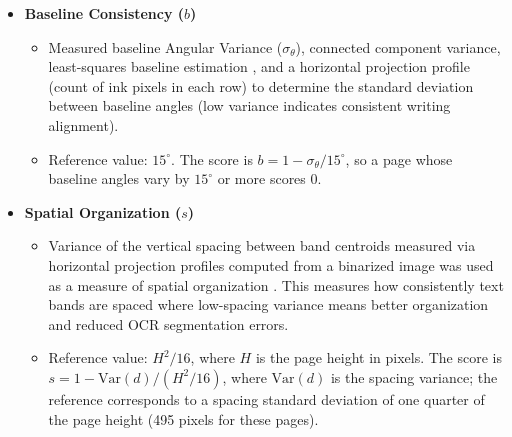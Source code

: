 \documentclass[conference]{IEEEtran}
\begin{document}
\begin{itemize}
  \item \textbf{Baseline Consistency ($b$)}
  \begin{itemize}
    \item Measured baseline Angular Variance ($\sigma_\theta$), connected
    component variance, least-squares baseline estimation
    \cite{ogorman1993, opencv_shape}, and a horizontal projection profile
    (count of ink pixels in each row) \cite{likforman2007, papavassiliou2010}
    to determine the standard deviation between baseline angles (low variance
    indicates consistent writing alignment).
    \item Reference value: $15^\circ$. The score is
    $b = 1 - \sigma_\theta / 15^\circ$, so a page whose baseline angles vary by
    $15^\circ$ or more scores 0.
  \end{itemize}

  \item \textbf{Spatial Organization ($s$)}
  \begin{itemize}
    \item Variance of the vertical spacing between band centroids measured via
    horizontal projection profiles computed from a binarized image was used as
    a measure of spatial organization \cite{likforman2007}. This measures how
    consistently text bands are spaced where low-spacing variance means better
    organization and reduced OCR segmentation errors.
    \item Reference value: $H^2/16$, where $H$ is the page height in pixels.
    The score is $s = 1 - \mathrm{Var}(d) / (H^2/16)$, where $\mathrm{Var}(d)$
    is the spacing variance; the reference corresponds to a spacing standard
    deviation of one quarter of the page height (495 pixels for these pages).
  \end{itemize}


\end{itemize}
\end{document}
